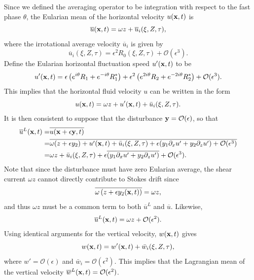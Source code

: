 \documentclass[a4paper,11pt]{article}
\newcommand{\p}{\partial}
\begin{document}
Since we defined the averaging operator to be integration with respect to the fast phase $\theta$, the Eularian mean of the horizontal velocity $u({\bf x},t)$ is  
\[
\overline{u}({\bf x},t) = \omega z + \overline{u}_{i}(\xi,Z,\tau), 
\]
where the irrotational average velocity $\overline{u}_{i}$ is given by 
\[
\overline{u}_{i}(\xi,Z,\tau) = \epsilon^{2}R_{0}(\xi,Z,\tau) + \mathcal{O}(\epsilon^{3}).
\]
Define the Eularian horizontal fluctuation speed $u'({\bf x},t)$ to be
\[
u'({\bf x},t) = \epsilon\left(e^{i\theta}R_{1} + e^{-i\theta}R_{1}^{\ast} \right)
+  \epsilon^{2}\left( e^{2i\theta}R_{2} + e^{-2i\theta}R_{2}^{\ast}\right)  + \mathcal{O}(\epsilon^{3}).
\]
This implies that the horizontal fluid velocity $u$ can be written in the form 
\[
u({\bf x},t) = \omega z +  u'({\bf x},t) + \bar{u}_{i}(\xi,Z,\tau).
\]
It is then consistent to suppose that the disturbance ${\bf y}=\mathcal{O}(\epsilon)$, so that
\begin{align*}
\overline{u}^{L}({\bf x},t) = & \overline{u({\bf x} + \epsilon {\bf y},t)} \\
= & \overline{\omega (z + \epsilon y_{2}) +  u'({\bf x},t) + \bar{u}_{i}(\xi,Z,\tau) + \epsilon (y_{1}\p_{x}u' + y_{2}\p_{z}u') + \mathcal{O}(\epsilon^{3})} \\
= & \omega z + \bar{u}_{i}(\xi,Z,\tau) + \epsilon \overline{(y_{1}\p_{x}u' + y_{2}\p_{z}u')} + \mathcal{O}(\epsilon^{3}).
\end{align*}
Note that since the disturbance must have zero Eularian average, the
shear current $\omega z$ cannot directly contribute to Stokes drift
since
\[
\overline{\omega\left(z + \epsilon y_{2}({\bf x},t)\right)} = \omega z,
\]
and thus $\omega z$ must be a common term to both $\overline{u}^{L}$ and $\overline{u}$.  Likewise,
\[
\overline{u}^{L}({\bf x},t) = \omega z + \mathcal{O}(\epsilon^{2}).
\]
Using identical arguments for the vertical velocity, $w({\bf x},t)$ gives 
\[
w({\bf x},t) = w'({\bf x},t) + \bar{w}_{i}(\xi,Z,\tau),
\]
where $w'=\mathcal{O}(\epsilon)$ and $\bar{w}_{i}=\mathcal{O}(\epsilon^{2})$.  This implies that the Lagrangian mean of the vertical velocity $\overline{w}^{L}({\bf x},t) = \mathcal{O}(\epsilon^{2})$.
\end{document}
